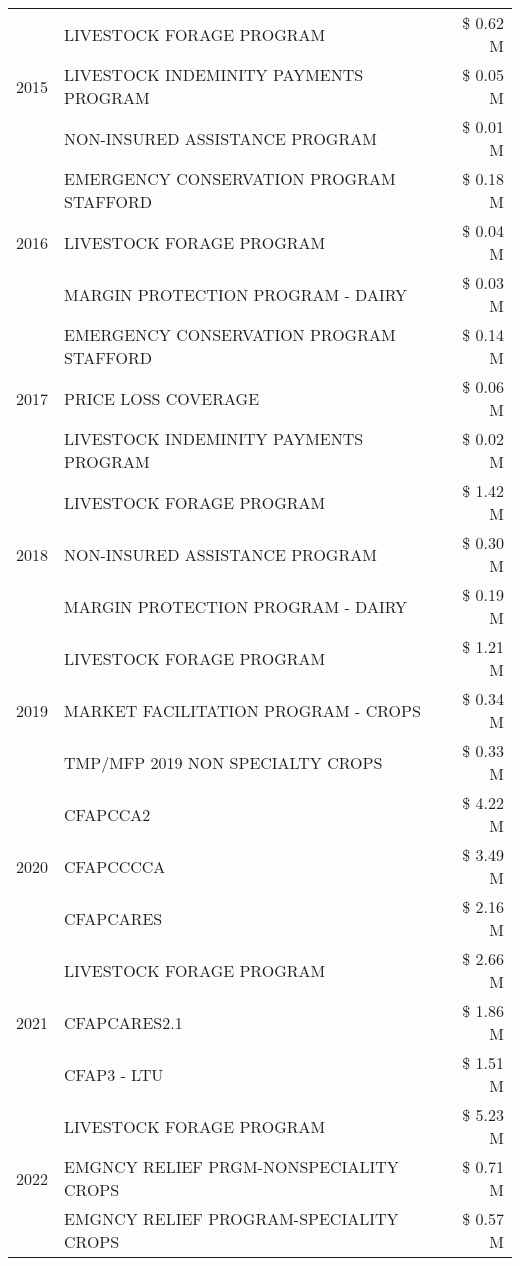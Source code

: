 \begin{tabular}{llr}
\cline{1-3}
\multirow[t]{3}{*}{2015} & LIVESTOCK FORAGE PROGRAM & \$ 0.62 M \\
 & LIVESTOCK INDEMINITY PAYMENTS PROGRAM & \$ 0.05 M \\
 & NON-INSURED ASSISTANCE PROGRAM & \$ 0.01 M \\
\cline{1-3}
\multirow[t]{3}{*}{2016} & EMERGENCY CONSERVATION PROGRAM STAFFORD & \$ 0.18 M \\
 & LIVESTOCK FORAGE PROGRAM & \$ 0.04 M \\
 & MARGIN PROTECTION PROGRAM - DAIRY & \$ 0.03 M \\
\cline{1-3}
\multirow[t]{3}{*}{2017} & EMERGENCY CONSERVATION PROGRAM STAFFORD & \$ 0.14 M \\
 & PRICE LOSS COVERAGE & \$ 0.06 M \\
 & LIVESTOCK INDEMINITY PAYMENTS PROGRAM & \$ 0.02 M \\
\cline{1-3}
\multirow[t]{3}{*}{2018} & LIVESTOCK FORAGE PROGRAM & \$ 1.42 M \\
 & NON-INSURED ASSISTANCE PROGRAM & \$ 0.30 M \\
 & MARGIN PROTECTION PROGRAM - DAIRY & \$ 0.19 M \\
\cline{1-3}
\multirow[t]{3}{*}{2019} & LIVESTOCK FORAGE PROGRAM & \$ 1.21 M \\
 & MARKET FACILITATION PROGRAM - CROPS & \$ 0.34 M \\
 & TMP/MFP 2019 NON SPECIALTY CROPS & \$ 0.33 M \\
\cline{1-3}
\multirow[t]{3}{*}{2020} & CFAPCCA2 & \$ 4.22 M \\
 & CFAPCCCCA & \$ 3.49 M \\
 & CFAPCARES & \$ 2.16 M \\
\cline{1-3}
\multirow[t]{3}{*}{2021} & LIVESTOCK FORAGE PROGRAM & \$ 2.66 M \\
 & CFAPCARES2.1 & \$ 1.86 M \\
 & CFAP3 - LTU & \$ 1.51 M \\
\cline{1-3}
\multirow[t]{3}{*}{2022} & LIVESTOCK FORAGE PROGRAM & \$ 5.23 M \\
 & EMGNCY RELIEF PRGM-NONSPECIALITY CROPS & \$ 0.71 M \\
 & EMGNCY RELIEF PROGRAM-SPECIALITY CROPS & \$ 0.57 M \\
\cline{1-3}
\bottomrule
\end{tabular}
